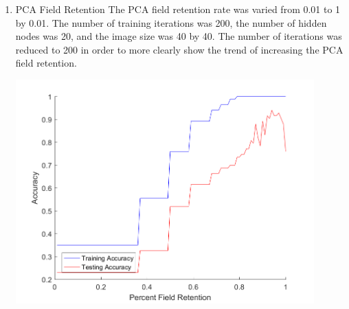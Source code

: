 \documentclass[12pt]{article}
\begin{document}
\begin{enumerate}
\begin{center}
    \label{fig:img_size}
  \end{center}
  \item PCA Field Retention
  The PCA field retention rate was varied from 0.01 to 1 by 0.01. The number of training iterations was 200, the number of hidden nodes was 20, and the image size was 40 by 40. The number of iterations was reduced to 200 in order to more clearly show the trend of increasing the PCA field retention.
  \begin{center}
    \includegraphics[width=115mm]{./accuracy_imgs/percent_field_retention_empirical.png}
    \label{fig:img_size}
  \end{center}
\end{enumerate}

\newpage
\end{document}
